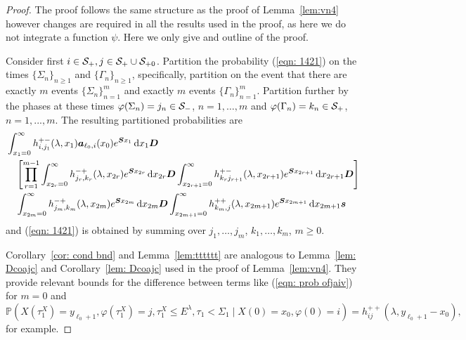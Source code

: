 \begin{proof}
	The proof follows the same structure as the proof of Lemma~\ref{lem:vn4} however changes are required in all the results used in the proof, as here we do not integrate a function \(\psi\). Here we only give and outline of the proof. 

	Consider first \(i\in \mathcal{S}_+,j\in\mathcal{S}_+\cup\mathcal{S}_{+0}\). Partition the probability (\ref{eqn: 1421}) on the times \(\{\Sigma_n\}_{n\geq 1}\) and \(\{\Gamma_n\}_{n\geq 1}\), specifically, partition on the event that there are exactly \(m\) events \(\{\Sigma_n\}_{n=1}^m\) and exactly \(m\) events \(\{\Gamma_n\}_{n=1}^m\). Partition further by the phases at these times \(\varphi(\Sigma_n)=j_n\in\mathcal{S}_-\), \(n=1,\dots,m\) and \(\varphi(\Gamma_n)=k_n\in\mathcal{S}_+\), \(n=1,...,m\). The resulting partitioned probabilities are
	\begin{align}
                 &\int_{x_1=0}^\infty h^{+-}_{i,j_{1}}(\lambda,x_1)\boldsymbol   a_{\ell_0,i}(x_0)e^{\boldsymbol{S}x_1}\, \mathrm{d} x_1 \boldsymbol{D}\nonumber
            	\\&\nonumber \quad \left[\prod_{r=1}^{m-1} \int_{x_{2r}=0}^\infty h^{-+}_{j_r,k_r}(\lambda,x_{2r}) e^{\boldsymbol{S}x_{2r}}\, \mathrm{d} x_{2r}\boldsymbol D \int_{x_{2r+1}=0}^\infty h^{+-}_{k_rj_{r+1}}(\lambda,x_{2r+1}) e^{\boldsymbol{S}x_{2r+1}} \, \mathrm{d} x_{2r+1}\boldsymbol D\right]
            	\\&
            	\quad \int_{x_{2m}=0}^\infty h^{-+}_{j_{m},k_m}(\lambda, x_{2m}) e^{\boldsymbol{S}x_{2m}} \, \mathrm{d} x_{2m} \boldsymbol{D}\int_{x_{2m+1}=0}^\infty h^{++}_{k_m,j}(\lambda,x_{2m+1}) e^{\boldsymbol{S}x_{2m+1}}\, \mathrm{d} x_{2m+1}\boldsymbol s  \label{eqn: prob ofjaiv}
	\end{align}
	and (\ref{eqn: 1421}) is obtained by summing over \(j_1,\dots,j_m\), \(k_1,\dots,k_m\), \(m\geq 0\). 
	
	Corollary~\ref{cor: cond bnd} and Lemma~\ref{lem:tttttt} are analogous to Lemma~\ref{lem: Dcoajc} and Corollary~\ref{lem: Dcoajc} used in the proof of Lemma~\ref{lem:vn4}. They provide relevant bounds for the difference between terms like (\ref{eqn: prob ofjaiv}) for \(m=0\) and 
	\[\mathbb P(X(\tau_1^X)=y_{\ell_0+1},\varphi(\tau_1^X)=j,\tau_1^X\leq E^\lambda, \tau_1<\Sigma_1 \mid X(0)=x_0, \varphi(0)=i) = h_{ij}^{++}(\lambda,y_{\ell_0+1}-x_0),\]
	for example.
	

\end{proof}
